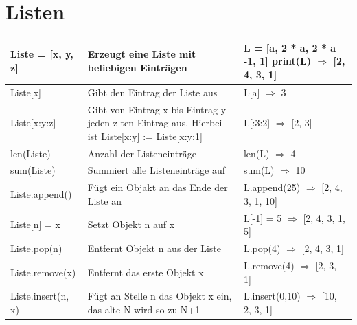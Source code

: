 \documentclass[a4paper,12pt]{article}
\begin{document}
\section*{Listen}

\begin{center}
\begin{tabular}{|p{3cm}|p{8cm}|p{3cm}|}
\hline
Liste = [x, y, z] & Erzeugt eine Liste mit beliebigen Einträgen & L = [a, 2 * a, 2 * a -1, 1] \newline{} print(L) \newline{} $\Rightarrow$ [2, 4, 3, 1] \\
\hline
Liste[x] & Gibt den Eintrag der Liste aus & L[a] \newline{} $\Rightarrow$ 3 \\
\hline
Liste[x:y:z] & Gibt von Eintrag x bis Eintrag y jeden z-ten Eintrag aus. Hierbei ist Liste[x:y] := Liste[x:y:1] & L[:3:2] \newline{} $\Rightarrow$ [2, 3] \\
\hline
len(Liste) & Anzahl der Listeneinträge & len(L) \newline{} $\Rightarrow$ 4 \\
\hline
sum(Liste) & Summiert alle Listeneinträge auf & sum(L) \newline{} $\Rightarrow$ 10 \\
\hline
Liste.append() & Fügt ein Objakt an das Ende der Liste an & L.append(25) \newline{} $\Rightarrow$ [2, 4, 3, 1, 10] \\
\hline
Liste[n] = x & Setzt Objekt n auf x & L[-1] = 5 \newline{} $\Rightarrow$ [2, 4, 3, 1, 5] \\
\hline
Liste.pop(n) & Entfernt Objekt n aus der Liste & L.pop(4) \newline{} $\Rightarrow$ [2, 4, 3, 1] \\
\hline
Liste.remove(x) & Entfernt das erste Objekt x & L.remove(4) \newline{} $\Rightarrow$ [2, 3, 1] \\
\hline
Liste.insert(n, x) & Fügt an Stelle n das Objekt x ein, das alte N wird so zu N+1 & L.insert(0,10) \newline{} $\Rightarrow$ [10, 2, 3, 1] \\
\hline
\end{tabular}
\end{center}
\end{document}
